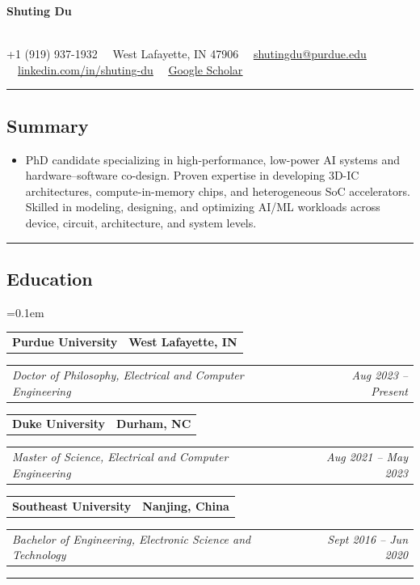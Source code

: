 \documentclass[10.5pt,letterpaper]{article}
\makeatletter
\newcommand{\headerrow}[2]
{\begin{tabular*}{\linewidth}{l@{\extracolsep{\fill}}r}
#1 &
#2 \\
\end{tabular*}}
\makeatother
\begin{document}
\begin{center}
	{\Huge \textbf{Shuting Du}}\\
	
	\vspace{0.13cm}
	
	\raisebox{-0.2\height}{\Large }  \\
    +1 (919) 937-1932 \hfill  \ \ 
    West Lafayette, IN 47906 \hfill \ \  
    \href{mailto:shutingdu@purdue.edu}{\underline{shutingdu@purdue.edu}} \hfill  \ \
    \href{https://www.linkedin.com/in/shuting-du/}{\underline{linkedin.com/in/shuting-du}} \hfill \ \
    \href{https://scholar.google.com/citations?hl=en&user=HPHuVUUAAAAJ}{\underline{Google Scholar}} \hfill
 
\end{center}
\hrule
\vspace{-1em}
\subsection*{\Large Summary}
\hyphenpenalty=1000
\begin{itemize}[leftmargin=1em, label={}]
    \item
    PhD candidate specializing in high-performance, low-power AI systems and hardware–software co-design. Proven expertise in developing 3D-IC architectures, compute-in-memory chips, and heterogeneous SoC accelerators. Skilled in modeling, designing, and optimizing AI/ML workloads across device, circuit, architecture, and system levels.
\end{itemize}
\hrule
\vspace{-1em}
\subsection*{\Large Education}
\begin{itemize}[leftmargin=1em]
	\parskip=0.1em
	      \headerrow
	      {\textbf{\large Purdue University}}
	      {\textbf{West Lafayette, IN}}
	      \headerrow
	      {\emph{Doctor of Philosophy, Electrical and Computer Engineering}  }
	      {\emph{Aug 2023 -- Present}}	
	      \headerrow
	      {\textbf{\large Duke University}}
	      {\textbf{Durham, NC}}
	      \headerrow
	      {\emph{Master of Science, Electrical and Computer Engineering}  }
	      {\emph{Aug 2021 -- May 2023}}	
	      \headerrow
	      {\textbf{\large Southeast University}}
	      {\textbf{Nanjing, China}}
	      \headerrow
	      {\emph{Bachelor of Engineering, Electronic Science and Technology}}
	      {\emph{Sept 2016 -- Jun 2020}}      	      	      
\end{itemize}
\hrule
\vspace{-1em}
\end{document}
